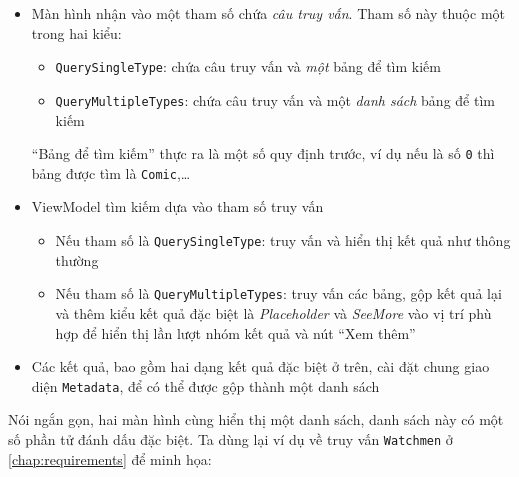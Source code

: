 \documentclass[../../../../thesis]{subfiles}
\begin{document}
\begin{itemize}
    \item
        Màn hình nhận vào một tham số chứa \emph{câu truy vấn}. Tham số này
        thuộc một trong hai kiểu:

        \begin{itemize}
            \item
                \texttt{QuerySingleType}: chứa câu truy vấn và \emph{một} bảng
                để tìm kiếm
            \item
                \texttt{QueryMultipleTypes}: chứa câu truy vấn và một \emph{danh
                sách} bảng để tìm kiếm
        \end{itemize}

        ``Bảng để tìm kiếm'' thực ra là một số quy định trước, ví dụ nếu là số
        \texttt{0} thì bảng được tìm là \texttt{Comic},\ldots{}
    \item
        ViewModel tìm kiếm dựa vào tham số truy vấn

        \begin{itemize}
            \item
                Nếu tham số là \texttt{QuerySingleType}: truy vấn và hiển thị
                kết quả như thông thường
            \item
                Nếu tham số là \texttt{QueryMultipleTypes}: truy vấn các bảng,
                gộp kết quả lại và thêm kiểu kết quả đặc biệt là
                \emph{Placeholder} và \emph{SeeMore} vào vị trí phù hợp để hiển
                thị lần lượt nhóm kết quả và nút ``Xem thêm''
        \end{itemize}
    \item
        Các kết quả, bao gồm hai dạng kết quả đặc biệt ở trên, cài đặt chung
        giao diện \texttt{Metadata}, để có thể được gộp thành một danh sách
\end{itemize}

Nói ngắn gọn, hai màn hình cùng hiển thị một danh sách, danh sách này có một số
phần tử đánh dấu đặc biệt. Ta dùng lại ví dụ về truy vấn \texttt{Watchmen} ở
\autoref{chap:requirements} để minh họa:
\end{document}
